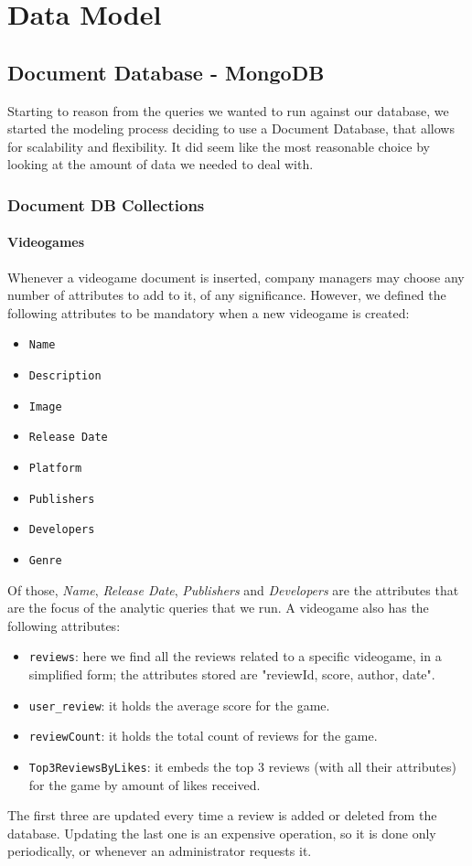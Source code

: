 \chapter{Data Model}
\section{Document Database - MongoDB}
Starting to reason from the queries we wanted to run against our database, we started the modeling process deciding to use a Document Database, that allows for scalability and flexibility. It did seem like the most reasonable choice by looking at the amount of data we needed to deal with.
\subsection{Document DB Collections}
\subsubsection{Videogames}
Whenever a videogame document is inserted, company managers may choose any number of attributes to add to it, of any significance. However, we defined the following attributes to be mandatory when a new videogame is created:
\begin{itemize}
	\item \texttt{Name}
        \item \texttt{Description}
        \item \texttt{Image}
	\item \texttt{Release Date}
	\item \texttt{Platform} 
	\item \texttt{Publishers} 
	\item \texttt{Developers}
        \item \texttt{Genre}
\end{itemize}
Of those, \emph{Name}, \emph{Release Date}, \emph{Publishers} and \emph{Developers} are the attributes that are the focus of the analytic queries that we run.
A videogame also has the following attributes:
\begin{itemize}
    \item \texttt{reviews}: here we find all the reviews related to a specific videogame, in a simplified form; the attributes stored are "reviewId, score, author, date". 
    \item \texttt{user\_review}: it holds the average score for the game.  
    \item \texttt{reviewCount}: it holds the total count of reviews for the game.
    \item \texttt{Top3ReviewsByLikes}: it embeds the top 3 reviews (with all their attributes) for the game by amount of likes received.
\end{itemize}
The first three are updated every time a review is added or deleted from the database. Updating the last one is an expensive operation, so it is done only periodically, or whenever an administrator requests it.

